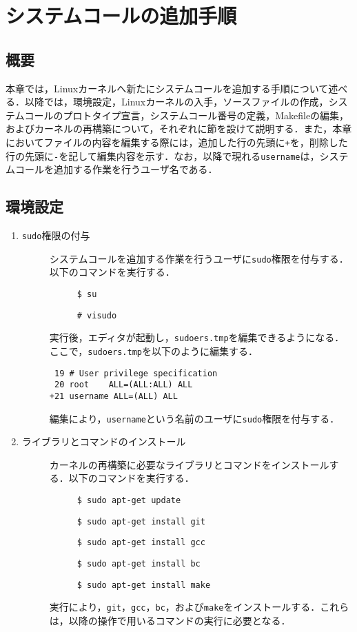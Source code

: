\documentclass[12pt]{jsarticle}
\begin{document}
\section{システムコールの追加手順}
\subsection{概要}
本章では，Linuxカーネルへ新たにシステムコールを追加する手順について述べる．以降では，環境設定，Linuxカーネルの入手，ソースファイルの作成，システムコールのプロトタイプ宣言，システムコール番号の定義，Makefileの編集，およびカーネルの再構築について，それぞれに節を設けて説明する．また，本章においてファイルの内容を編集する際には，追加した行の先頭に\verb|+|を，削除した行の先頭に\verb|-|を記して編集内容を示す．なお，以降で現れる\verb|username|は，システムコールを追加する作業を行うユーザ名である．
\subsection{環境設定}
\begin{enumerate}
\item \verb|sudo|権限の付与
  \begin{description}
  \item[] システムコールを追加する作業を行うユーザに\verb|sudo|権限を付与する．以下のコマンドを実行する．
    \begin{description}
    \item[] \verb|$ su|
    \item[] \verb|# visudo|
    \end{description}
  \item[] 実行後，エディタが起動し，\verb|sudoers.tmp|を編集できるようになる．ここで，\verb|sudoers.tmp|を以下のように編集する．
\begin{verbatim}
 19 # User privilege specification
 20 root    ALL=(ALL:ALL) ALL
+21 username ALL=(ALL) ALL
\end{verbatim}
    \item[] 編集により，\verb|username|という名前のユーザに\verb|sudo|権限を付与する．
  \end{description}
\item ライブラリとコマンドのインストール
  \begin{description}
  \item[] カーネルの再構築に必要なライブラリとコマンドをインストールする．以下のコマンドを実行する．
    \begin{description}
    \item[] \verb|$ sudo apt-get update|
    \item[] \verb|$ sudo apt-get install git|
    \item[] \verb|$ sudo apt-get install gcc|
    \item[] \verb|$ sudo apt-get install bc |
    \item[] \verb|$ sudo apt-get install make|
    \end{description}
  \item[] 実行により，\verb|git|，\verb|gcc|，\verb|bc|，および\verb|make|をインストールする．これらは，以降の操作で用いるコマンドの実行に必要となる．
  \end{description}
\end{enumerate}
\end{document}
